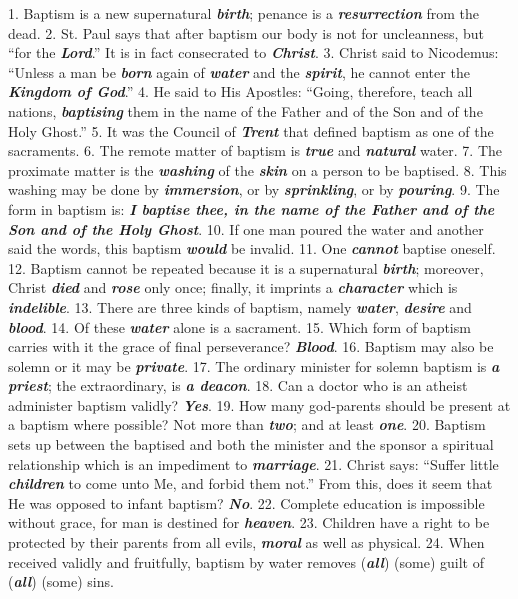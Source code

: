 \documentclass[a5paper]{article}
\newcommand\answer[1]{\textbf{\textit{#1}}}
\begin{document}
\newpage

1. Baptism is a new supernatural \answer{birth}; penance is a \answer{resurrection} from the dead.
2. St. Paul says that after baptism our body is not for uncleanness, but “for the \answer{Lord}.” It is in fact consecrated to \answer{Christ}.
3. Christ said to Nicodemus: “Unless a man be \answer{born} again of \answer{water} and the \answer{spirit}, he cannot enter the \answer{Kingdom of God}.”
4. He said to His Apostles: “Going, therefore, teach all nations, \answer{baptising} them in the name of the Father and of the Son and of the Holy Ghost.”
5. It was the Council of \answer{Trent} that defined baptism as one of the sacraments.
6. The remote matter of baptism is \answer{true} and \answer{natural} water.
7. The proximate matter is the \answer{washing} of the \answer{skin} on a person to be baptised.
8. This washing may be done by \answer{immersion}, or by \answer{sprinkling}, or by \answer{pouring}.
9. The form in baptism is: \answer{I baptise thee, in the name of the Father and of the Son and of the Holy Ghost}.
10. If one man poured the water and another said the words, this baptism \answer{would} be invalid.
11. One \answer{cannot} baptise oneself.
12. Baptism cannot be repeated because it is a supernatural \answer{birth}; moreover, Christ \answer{died} and \answer{rose} only once; finally, it imprints a \answer{character} which is \answer{indelible}.
13. There are three kinds of baptism, namely \answer{water}, \answer{desire} and \answer{blood}.
14. Of these \answer{water} alone is a sacrament.
15. Which form of baptism carries with it the grace of final perseverance? \answer{Blood}.
16. Baptism may also be solemn or it may be \answer{private}.
17. The ordinary minister for solemn baptism is \answer{a priest}; the extraordinary, is \answer{a deacon}.
18. Can a doctor who is an atheist administer baptism validly? \answer{Yes}.
19. How many god-parents should be present at a baptism where possible? Not more than \answer{two}; and at least \answer{one}.
20. Baptism sets up between the baptised and both the minister and the sponsor a spiritual relationship which is an impediment to \answer{marriage}.
21. Christ says: “Suffer little \answer{children} to come unto Me, and forbid them not.” From this, does it seem that He was opposed to infant baptism? \answer{No}.
22. Complete education is impossible without grace, for man is destined for \answer{heaven}.
23. Children have a right to be protected by their parents from all evils, \answer{moral} as well as physical.
24. When received validly and fruitfully, baptism by water removes (\answer{all}) (some) guilt of (\answer{all}) (some) sins.
\end{document}
